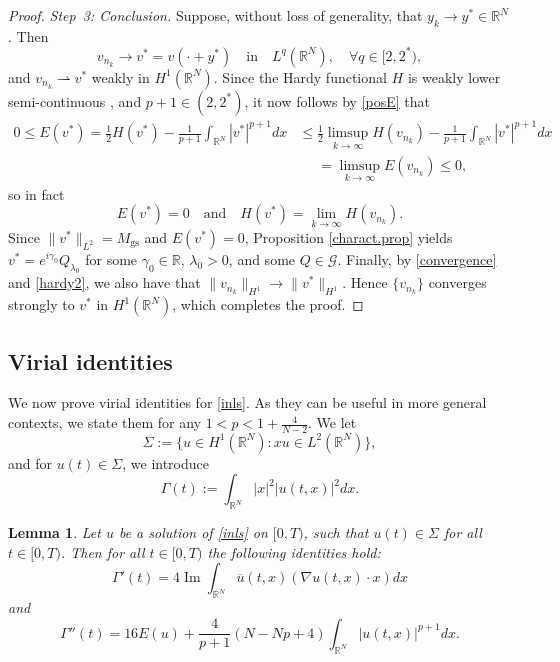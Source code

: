\documentclass[reqno]{amsart}
\newcommand{\real}{\mathbb{R}}
\newcommand{\rn}{\real^N}
\newcommand{\wto}{\rightharpoonup}
\let\le=\leqslant
\DeclareMathOperator \im{Im}
\theoremstyle{plain}
\newtheorem{lemma}{Lemma}
\theoremstyle{definition}
\numberwithin{equation}{section}
\begin{document}
\begin{proof}
\medskip
\noindent
{\em Step~3: Conclusion.} Suppose, without loss of generality, that $y_k\to y^*\in\rn$.
Then
\[
v_{n_k}\to v^*=v(\cdot+y^*) \quad \text{in} \quad L^q(\rn), \quad \forall q\in[2,2^*),
\]
and $v_{n_k}\wto v^*$ weakly in $H^1(\rn)$.
Since the Hardy functional $H$ is weakly lower semi-continuous \cite{montefusco},
and $p+1\in(2,2^*)$, it now follows by \eqref{posE} that
\[
\begin{split}
0\le E(v^*)=\frac{1}{2}H(v^*)-\frac{1}{p+1}\int_{\rn}|v^*|^{p+1}dx
&\le \frac{1}{2}\limsup_{k\rightarrow\infty}H(v_{n_k})-\frac{1}{p+1}\int_{\rn}|v^*|^{p+1}dx\\
&\phantom{\le}=\limsup_{k\rightarrow\infty}E(v_{n_k})\le 0,
\end{split}
\]
so in fact
\begin{equation}\label{convergence}
E(v^*)=0 \quad\text{and}\quad H(v^*)=\lim_{k\rightarrow\infty}H(v_{n_k}).
\end{equation}
Since $\|v^*\|_{L^2}=M_\mathrm{gs}$ and $E(v^*)=0$, Proposition \ref{charact.prop} yields
$v^*=e^{i\gamma_0}Q_{\lambda_0}$ for some $\gamma_0\in\real$, $\lambda_0>0$, 
and some $Q\in \mathcal{G}$. 
Finally, by \eqref{convergence} and \eqref{hardy2}, 
we also have that $\|v_{n_k}\|_{H^1}\rightarrow \|v^*\|_{H^1}$.
Hence $\{v_{n_k}\}$ converges strongly to $v^*$ in $H^1(\rn)$, which completes the proof.
\end{proof}




\subsection{Virial identities}

We now prove virial identities for \eqref{inls}. 
As they can be useful in more general contexts, we state them for any $1<p<1+\frac{4}{N-2}$.
We let
\[
\Sigma :=\{u \in H^1(\rn) : xu \in L^2(\rn) \},
\]
and for $u(t)\in\Sigma$, we introduce
\[
\Gamma(t):=\int_{\rn} |x|^2|u(t,x)|^2dx.
\]

\begin{lemma}\label{virial.lemma}
Let $u$ be a solution of \eqref{inls} on $[0,T)$, such that $u(t)\in \Sigma$ for all $t\in [0,T)$. 
Then for all $t\in[0,T)$ the following identities hold:
\begin{equation} \label{virialone}
\Gamma'(t)=4\im\int_{\rn} \overline{u}(t,x)(\nabla u(t,x)\cdot x)dx
\end{equation}
and
\begin{equation}\label{virialtwo}
\Gamma''(t)=16E(u)+\frac{4}{p+1}(N-Np+4)\int_{\rn} |u(t,x)|^{p+1}dx.
\end{equation}
\end{lemma}
\end{document}
